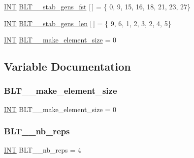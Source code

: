 \begin{DoxyCompactItemize}
\item 
\mbox{\hyperlink{galois_8h_a09fddde158a3a20bd2dcadb609de11dc}{I\+NT}} \mbox{\hyperlink{data___b_l_t_8_c_a5656753189bab2288ef807c21c25bca9}{B\+L\+T\+\_\+\_\+stab\+\_\+gens\+\_\+fst}} \mbox{[}$\,$\mbox{]} = \{ 0, 9, 15, 16, 18, 21, 23, 27\}
\item 
\mbox{\hyperlink{galois_8h_a09fddde158a3a20bd2dcadb609de11dc}{I\+NT}} \mbox{\hyperlink{data___b_l_t_8_c_aaac1b75574766b859fb92f3ed74adf9d}{B\+L\+T\+\_\+\_\+stab\+\_\+gens\+\_\+len}} \mbox{[}$\,$\mbox{]} = \{ 9, 6, 1, 2, 3, 2, 4, 5\}
\item 
\mbox{\hyperlink{galois_8h_a09fddde158a3a20bd2dcadb609de11dc}{I\+NT}} \mbox{\hyperlink{data___b_l_t_8_c_a37bac37c653b056b3c5be7c607b8f580}{B\+L\+T\+\_\+\_\+make\+\_\+element\+\_\+size}} = 0
\end{DoxyCompactItemize}


\subsection{Variable Documentation}
\mbox{\label{data___b_l_t_8_c_ad30bd7d8a668b40a8c824e0256c2fb77}} 
\subsubsection{\texorpdfstring{B\+L\+T\+\_\+\_\+make\+\_\+element\+\_\+size}{BLT\_11\_make\_element\_size}}
{\footnotesize\ttfamily \mbox{\hyperlink{galois_8h_a09fddde158a3a20bd2dcadb609de11dc}{I\+NT}} B\+L\+T\+\_\+\_\+make\+\_\+element\+\_\+size = 0}

\mbox{\label{data___b_l_t_8_c_aa4f276c44728a7e04a6b3c7e9122e921}} 
\subsubsection{\texorpdfstring{B\+L\+T\+\_\+\_\+nb\+\_\+reps}{BLT\_11\_nb\_reps}}
{\footnotesize\ttfamily \mbox{\hyperlink{galois_8h_a09fddde158a3a20bd2dcadb609de11dc}{I\+NT}} B\+L\+T\+\_\+\_\+nb\+\_\+reps = 4}

